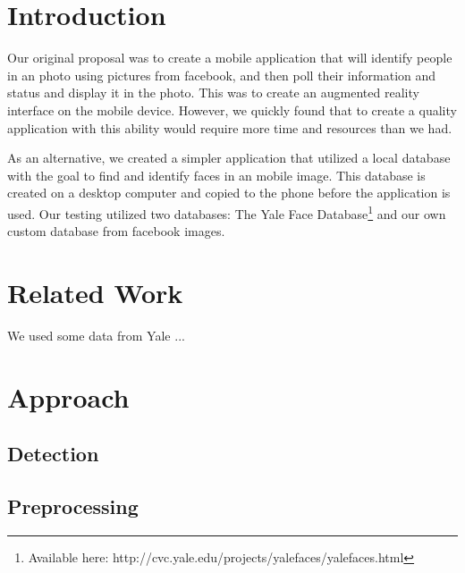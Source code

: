 \section{Introduction} %


Our original proposal was to create a mobile application that will
identify people in an photo using pictures from facebook, and then
poll their information and status and display it in the photo.  This
was to create an augmented reality interface on the mobile device.
However, we quickly found that to create a quality application with
this ability would require more time and resources than we had.

As an alternative, we created a simpler application that utilized a
local database with the goal to find and identify faces in an mobile
image.  This database is created on a desktop computer and copied to
the phone before the application is used.  Our testing utilized two
databases: The Yale Face Database\footnote{Available here:
  http://cvc.yale.edu/projects/yalefaces/yalefaces.html}\cite{YaleFace}
and our own custom database from facebook images.


\section{Related Work} %

We used some data from Yale \cite{GeBeKr01}...




\section{Approach} %


\subsection{Detection}

\subsection{Preprocessing}



